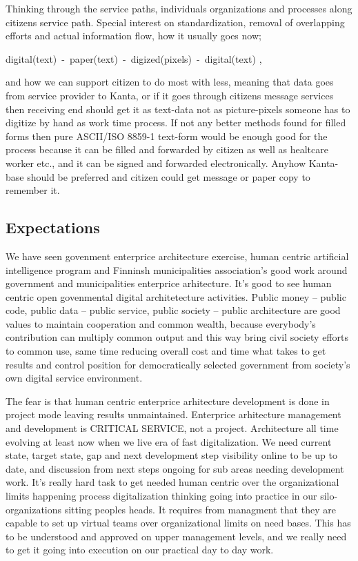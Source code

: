 Thinking through the service paths, individuals organizations and processes
along citizens service path. Special interest on standardization, removal
of overlapping efforts and actual information flow, how it usually goes now;
\hfill\break\begin{center}
digital(text)~-~paper(text)~-~digized(pixels)~-~digital(text)
\cite{VM006_00_2024},\end{center}
and how we can support citizen to do most with less, meaning that data goes
from service provider to Kanta, or if it goes through citizens message services
then receiving end should get it as text-data not as picture-pixels someone
has to digitize by hand as work time process. If not any better methods found
for filled forms then pure ASCII/ISO 8859-1 text-form would be enough good for
the process because it can be filled and forwarded by citizen as well as
healtcare worker etc., and it can be signed and forwarded electronically.
Anyhow Kanta-base should be preferred and citizen could get message or paper
copy to remember it.

\subsection{Expectations}
\label{expectations}

We have seen govenment enterprice architecture exercise, human centric
artificial intelligence program and Finninsh municipalities association's good
work around government and municipalities enterprice arhitecture. It's good
to see human centric open govenmental digital architetecture activities.
Public money -- public code, public data -- public service, public society --
public architecture are good values to maintain cooperation and common wealth,
because everybody's contribution can multiply common output and this way bring
civil society efforts to common use, same time reducing overall cost and time
what takes to get results and control position for democratically selected
government from society's own digital service environment.

The fear is that human centric enterprice arhitecture development is done in
project mode leaving results unmaintained. Enterprice arhitecture management
and development is CRITICAL SERVICE, not a project. Architecture all time
evolving at least now when we live era of fast digitalization. We need current
state, target state, gap and next development step visibility online to be up
to date, and discussion from next steps ongoing for sub areas needing
development work. It's really hard task to get needed human centric over the
organizational limits happening process digitalization thinking going into
practice in our silo-organizations sitting peoples heads. It requires from
managment that they are capable to set up virtual teams over organizational
limits on need bases. This has to be understood and approved on upper
management levels, and we really need to get it going into execution on our
practical day to day work.

